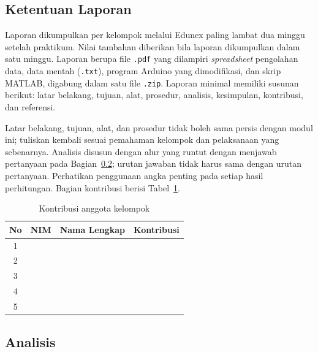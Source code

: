 \documentclass[11pt,a4paper]{article}
\begin{document}
\subsection{Ketentuan Laporan}
Laporan dikumpulkan per kelompok melalui Edunex paling lambat dua minggu setelah praktikum. Nilai tambahan diberikan bila laporan dikumpulkan dalam satu minggu. Laporan berupa file \texttt{.pdf} yang dilampiri \textit{spreadsheet} pengolahan data, data mentah (\texttt{.txt}), program Arduino yang dimodifikasi, dan skrip MATLAB, digabung dalam satu file \texttt{.zip}. Laporan minimal memiliki susunan berikut: latar belakang, tujuan, alat, prosedur, analisis, kesimpulan, kontribusi, dan referensi.

Latar belakang, tujuan, alat, dan prosedur tidak boleh sama persis dengan modul ini; tuliskan kembali sesuai pemahaman kelompok dan pelaksanaan yang sebenarnya. Analisis disusun dengan alur yang runtut dengan menjawab pertanyaan pada Bagian~\ref{sec:analisis}; urutan jawaban tidak harus sama dengan urutan pertanyaan. Perhatikan penggunaan angka penting pada setiap hasil perhitungan. Bagian kontribusi berisi Tabel~\ref{tab:kontribusi}.

\begin{table}[H]
	\centering
	\caption{Kontribusi anggota kelompok}
	\label{tab:kontribusi}
	\begin{tabularx}{\textwidth}{|c|c|l|X|}
		\hline
		\textbf{No} & \textbf{NIM} & \textbf{Nama Lengkap} & \textbf{Kontribusi} \\
		\hline
		1           &              &                       &                     \\
		2           &              &                       &                     \\
		3           &              &                       &                     \\
		4           &              &                       &                     \\
		5           &              &                       &                     \\
		\hline
	\end{tabularx}
\end{table}

\subsection{Analisis}
\label{sec:analisis}
\end{document}
